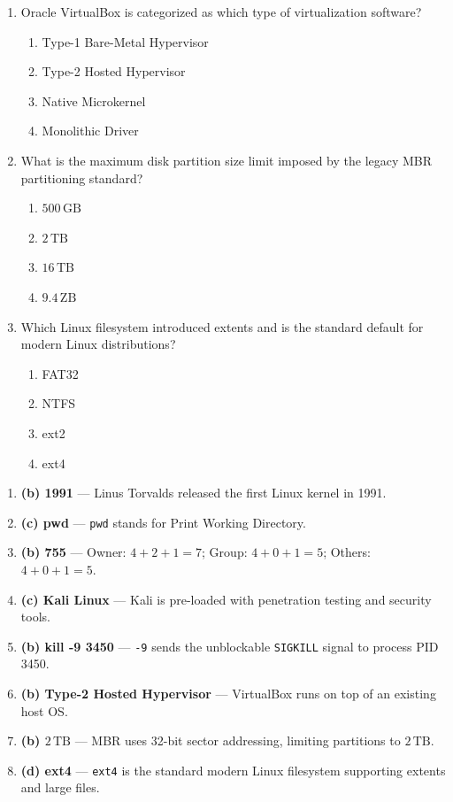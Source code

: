 \begin{enumerate}[leftmargin=1.5em]
    \item Oracle VirtualBox is categorized as which type of virtualization software?
    \begin{enumerate}[label=(\alph*)]
        \item Type-1 Bare-Metal Hypervisor
        \item Type-2 Hosted Hypervisor
        \item Native Microkernel
        \item Monolithic Driver
    \end{enumerate}

    \item What is the maximum disk partition size limit imposed by the legacy MBR partitioning standard?
    \begin{enumerate}[label=(\alph*)]
        \item $500\,\text{GB}$
        \item $2\,\text{TB}$
        \item $16\,\text{TB}$
        \item $9.4\,\text{ZB}$
    \end{enumerate}

    \item Which Linux filesystem introduced extents and is the standard default for modern Linux distributions?
    \begin{enumerate}[label=(\alph*)]
        \item FAT32
        \item NTFS
        \item ext2
        \item ext4
    \end{enumerate}
\end{enumerate}

\begin{solutionbox}
\begin{enumerate}
    \item \textbf{(b) 1991} --- Linus Torvalds released the first Linux kernel in 1991.
    \item \textbf{(c) pwd} --- \texttt{pwd} stands for Print Working Directory.
    \item \textbf{(b) 755} --- Owner: $4+2+1=7$; Group: $4+0+1=5$; Others: $4+0+1=5$.
    \item \textbf{(c) Kali Linux} --- Kali is pre-loaded with penetration testing and security tools.
    \item \textbf{(b) kill -9 3450} --- \texttt{-9} sends the unblockable \texttt{SIGKILL} signal to process PID 3450.
    \item \textbf{(b) Type-2 Hosted Hypervisor} --- VirtualBox runs on top of an existing host OS.
    \item \textbf{(b) $2\,\text{TB}$} --- MBR uses 32-bit sector addressing, limiting partitions to $2\,\text{TB}$.
    \item \textbf{(d) ext4} --- \texttt{ext4} is the standard modern Linux filesystem supporting extents and large files.
\end{enumerate}
\end{solutionbox}

